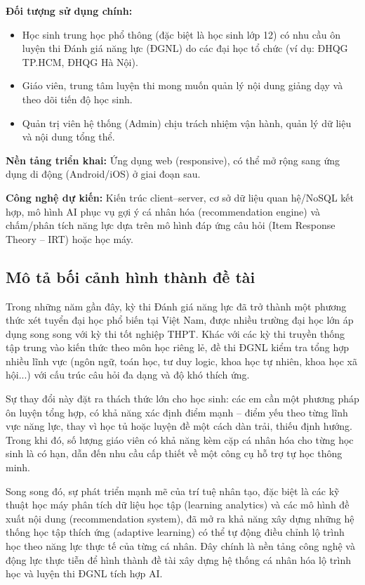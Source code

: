 \documentclass[12pt,a4paper]{article}
\begin{document}
	\textbf{Đối tượng sử dụng chính:}
	\begin{itemize}[nosep]
		\item Học sinh trung học phổ thông (đặc biệt là học sinh lớp 12) có nhu cầu ôn luyện thi Đánh giá năng lực (ĐGNL) do các đại học tổ chức (ví dụ: ĐHQG TP.HCM, ĐHQG Hà Nội).
		\item Giáo viên, trung tâm luyện thi mong muốn quản lý nội dung giảng dạy và theo dõi tiến độ học sinh.
		\item Quản trị viên hệ thống (Admin) chịu trách nhiệm vận hành, quản lý dữ liệu và nội dung tổng thể.
	\end{itemize}
	
	\textbf{Nền tảng triển khai:} Ứng dụng web (responsive), có thể mở rộng sang ứng dụng di động (Android/iOS) ở giai đoạn sau.
	
	\textbf{Công nghệ dự kiến:} Kiến trúc client--server, cơ sở dữ liệu quan hệ/NoSQL kết hợp, mô hình AI phục vụ gợi ý cá nhân hóa (recommendation engine) và chấm/phân tích năng lực dựa trên mô hình đáp ứng câu hỏi (Item Response Theory -- IRT) hoặc học máy.
	
	\subsection{Mô tả bối cảnh hình thành đề tài}
	
	Trong những năm gần đây, kỳ thi Đánh giá năng lực đã trở thành một phương thức xét tuyển đại học phổ biến tại Việt Nam, được nhiều trường đại học lớn áp dụng song song với kỳ thi tốt nghiệp THPT. Khác với các kỳ thi truyền thống tập trung vào kiến thức theo môn học riêng lẻ, đề thi ĐGNL kiểm tra tổng hợp nhiều lĩnh vực (ngôn ngữ, toán học, tư duy logic, khoa học tự nhiên, khoa học xã hội...) với cấu trúc câu hỏi đa dạng và độ khó thích ứng.
	
	Sự thay đổi này đặt ra thách thức lớn cho học sinh: các em cần một phương pháp ôn luyện tổng hợp, có khả năng xác định điểm mạnh -- điểm yếu theo từng lĩnh vực năng lực, thay vì học tủ hoặc luyện đề một cách dàn trải, thiếu định hướng. Trong khi đó, số lượng giáo viên có khả năng kèm cặp cá nhân hóa cho từng học sinh là có hạn, dẫn đến nhu cầu cấp thiết về một công cụ hỗ trợ tự học thông minh.
	
	Song song đó, sự phát triển mạnh mẽ của trí tuệ nhân tạo, đặc biệt là các kỹ thuật học máy phân tích dữ liệu học tập (learning analytics) và các mô hình đề xuất nội dung (recommendation system), đã mở ra khả năng xây dựng những hệ thống học tập thích ứng (adaptive learning) có thể tự động điều chỉnh lộ trình học theo năng lực thực tế của từng cá nhân. Đây chính là nền tảng công nghệ và động lực thực tiễn để hình thành đề tài xây dựng hệ thống cá nhân hóa lộ trình học và luyện thi ĐGNL tích hợp AI.
	
\end{document}
